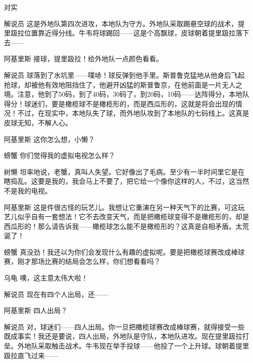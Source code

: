 \begin{dialog}{对实}
\begin{dialogue}
\item[解说员]这是外地队第四次进攻，本地队为守方。外地队采取踢悬空球的战术，提里趿拉位置靠近得分线。牛韦将球踢回——这是个高飘球，皮球朝着提里趿拉落下去——

\item[阿基里斯]接球，提里趿拉！给外地队一点颜色看看。

\item[解说员]球落到了水坑里——噗哧！球反弹到他手里。斯普鲁克猛地从他身后飞起抢球，却被他有效地阻挡住了，他避开凶猛的斯普鲁京，在他前面是一片无人之境。注意，他到了50码，到了40码，30码了，到20码，10码——达阵得分，本地队得分！球迷们，要是橄榄球不是橄榄形的，而是西瓜形的，这就是将会出现的情况！不过，在现实中，本地队失了球，而外地队攻到了本地队的七码线上。这真是皮球无知，不解人心。

\item[阿基里斯]这你怎么想，小懒？


\item[螃蟹]你们觉得我的虚拟电视怎么样？

\item[树懒]坦率地说，老蟹，真叫人失望。它好像出了毛病。至少有一半时间里它是在瞎捣乱。这要是我的，我会马上不要了，把它给一个像你这样的人，不过，这当然不是我的电视。

\item[阿基里斯]这是件很古怪的玩艺儿。我想让它重演在另一种天气下的比赛，可这玩艺儿似乎自有一套想法！它不去改变天气，而是把橄榄球变得不是橄榄形的，却是西瓜形的！那么请告诉我——橄榄球怎么能不是橄榄形的？这真是自相矛盾。太荒诞了！

\item[螃蟹]真没劲！我还以为你们会发现什么有趣的虚拟呢。要是把橄榄球赛改成棒球赛，刚才那场比赛的结局会怎么样，你们想看看吗？

\item[乌龟]噢，这主意太伟大啦！


\item[解说员]现在有四个人出局，还——

\item[阿基里斯]四人出局？

\item[解说员]对，球迷们——四人出局。你一旦把橄榄球赛改成棒球赛，就得接受一些既成事实！我还是要说，四人出局，外地队是守队，本地队进攻。现在提里趿拉打垒。外地队采取触击战术。牛韦现在举手投球——他投了一个上升球。球朝着提里趿拉直飞过来——


\end{dialogue}
\end{dialog}
